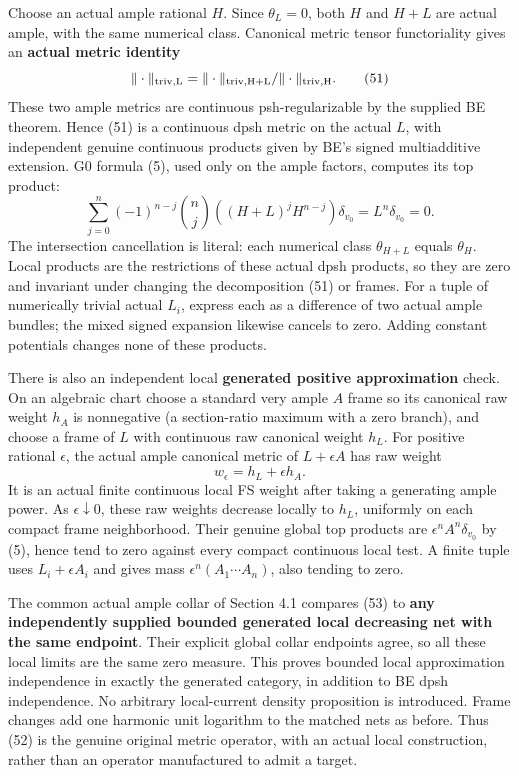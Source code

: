 \documentclass[
  10pt,
]{article}
\begin{document}
Choose an actual ample rational \(H\). Since \(\theta_L=0\), both \(H\)
and \(H+L\) are actual ample, with the same numerical class. Canonical
metric tensor functoriality gives an \textbf{actual metric identity}
\[\|\cdot\|_{\rm triv,L}=
\|\cdot\|_{\rm triv,H+L}/\|\cdot\|_{\rm triv,H}.\tag{51}\] These two
ample metrics are continuous psh-regularizable by the supplied BE
theorem. Hence (51) is a continuous dpsh metric on the actual \(L\),
with independent genuine continuous products given by BE's signed
multiadditive extension. G0 formula (5), used only on the ample factors,
computes its top product: \[\sum_{j=0}^n(-1)^{n-j}\binom nj
((H+L)^j H^{n-j})\delta_{v_0}=L^n\delta_{v_0}=0.\tag{52}\] The
intersection cancellation is literal: each numerical class
\(\theta_{H+L}\) equals \(\theta_H\). Local products are the
restrictions of these actual dpsh products, so they are zero and
invariant under changing the decomposition (51) or frames. For a tuple
of numerically trivial actual \(L_i\), express each as a difference of
two actual ample bundles; the mixed signed expansion likewise cancels to
zero. Adding constant potentials changes none of these products.

There is also an independent local \textbf{generated positive
approximation} check. On an algebraic chart choose a standard very ample
\(A\) frame so its canonical raw weight \(h_A\) is nonnegative (a
section-ratio maximum with a zero branch), and choose a frame of \(L\)
with continuous raw canonical weight \(h_L\). For positive rational
\(\epsilon\), the actual ample canonical metric of \(L+\epsilon A\) has
raw weight \[w_\epsilon=h_L+\epsilon h_A.\tag{53}\] It is an actual
finite continuous local FS weight after taking a generating ample power.
As \(\epsilon\downarrow0\), these raw weights decrease locally to
\(h_L\), uniformly on each compact frame neighborhood. Their genuine
global top products are \(\epsilon^n A^n\delta_{v_0}\) by (5), hence
tend to zero against every compact continuous local test. A finite tuple
uses \(L_i+\epsilon A_i\) and gives mass \(\epsilon^n(A_1\cdots A_n)\),
also tending to zero.

The common actual ample collar of Section 4.1 compares (53) to
\textbf{any independently supplied bounded generated local decreasing
net with the same endpoint}. Their explicit global collar endpoints
agree, so all these local limits are the same zero measure. This proves
bounded local approximation independence in exactly the generated
category, in addition to BE dpsh independence. No arbitrary
local-current density proposition is introduced. Frame changes add one
harmonic unit logarithm to the matched nets as before. Thus (52) is the
genuine original metric operator, with an actual local construction,
rather than an operator manufactured to admit a target.
\end{document}
